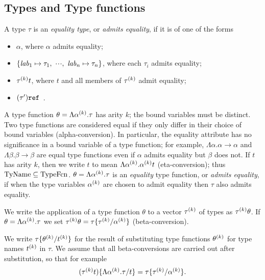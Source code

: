 \subsection{Types and Type functions}
\label{tyfun-sec}
A type $\tau$ is an {\sl equality type}, or {\sl admits equality}, if it is
of one of the forms
\begin{itemize}
\item $\alpha$, where $\alpha$ admits equality;
\item $\{\lab_1\mapsto\tau_1,\ \cdots,\ \lab_n\mapsto\tau_n\}$,
      where each $\tau_i$ admits equality;
\item $\mbox{$\tau^{(k)}$}t$, where $t$ and all members of $\mbox{$\tau^{(k)}$}$ admit equality;
\item $(\tau')\mbox{\tt ref}$\ .
\end{itemize}
\label{tyfcn-lab}
A type function $\theta=\Lambda\mbox{$\alpha^{(k)}$}.\tau$
 has arity $k$;  the bound variables must
be distinct. Two type functions are considered equal
if they only differ in their choice of bound variables (alpha-conversion).
In particular, the equality attribute has no significance in a
bound variable of a type function; for example, $\Lambda\alpha.\alpha\to
\alpha$ and $\Lambda\beta.\beta\to\beta$ are equal type functions
even if $\alpha$ admits equality but $\beta$ does not.
If $t$ has arity $k$, then we write $t$ to mean $\Lambda\mbox{$\alpha^{(k)}$}.\mbox{$\alpha^{(k)}$}t$
(eta-conversion); thus ${\rm TyName}\subseteq{\rm TypeFcn}$. $\theta=\Lambda\mbox{$\alpha^{(k)}$}.\tau$
is an {\sl equality} type function, or {\sl admits equality}, if when the
type variables $\mbox{$\alpha^{(k)}$}$ are chosen to admit equality then $\tau$ also admits
equality.

We write the application of a type function $\theta$ to a vector
$\mbox{$\tau^{(k)}$}$ of types as $\mbox{$\tau^{(k)}$}\theta$.
If $\theta=\Lambda\mbox{$\alpha^{(k)}$}.\tau$ we set $\mbox{$\tau^{(k)}$}\theta=\tau\{\mbox{$\tau^{(k)}$}/\mbox{$\alpha^{(k)}$}\}$
(beta-conversion).

We write $\tau\{\mbox{$\theta^{(k)}$}/\mbox{$t^{(k)}$}\}$ for the result of substituting type
functions $\mbox{$\theta^{(k)}$}$ for type names $\mbox{$t^{(k)}$}$ in $\tau$.
We assume that all beta-conversions
are carried out after substitution, so that for example
\[(\mbox{$\tau^{(k)}$}t)\{\Lambda\mbox{$\alpha^{(k)}$}.\tau/t\}=\tau\{\mbox{$\tau^{(k)}$}/\mbox{$\alpha^{(k)}$}\}.\]
\label{imp-ty-lab}
